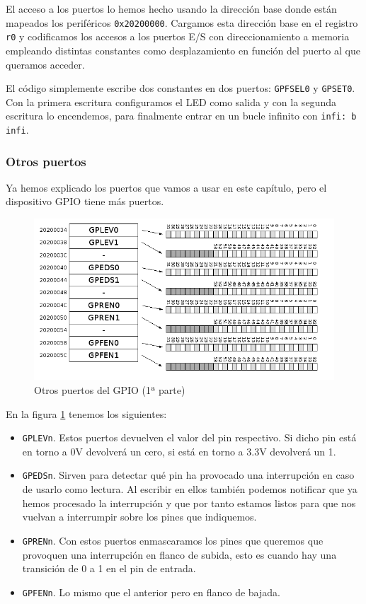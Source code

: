 El acceso a los puertos lo hemos hecho usando la dirección base donde
están mapeados los periféricos {\tt 0x20200000}. Cargamos esta dirección
base en el registro {\tt r0} y codificamos los accesos a los puertos
E/S con direccionamiento a memoria empleando distintas constantes como
desplazamiento en función del puerto al que queramos acceder.

El código simplemente escribe dos constantes en dos puertos: {\tt GPFSEL0} y {\tt GPSET0}.
Con la primera escritura configuramos el LED como salida y con la segunda escritura lo
encendemos, para finalmente entrar en un bucle infinito con {\tt infi: b infi}.

\subsubsection{Otros puertos}

Ya hemos explicado los puertos que vamos a usar en este capítulo, pero el dispositivo GPIO tiene
más puertos.

\begin{figure}[h]
  \centering
    \includegraphics[width=14cm]{graphs/gpio2.png}
  \caption{Otros puertos del GPIO (1ª parte)}
  \label{fig:gpio2}
\end{figure}

En la figura \ref{fig:gpio2} tenemos los siguientes:

\begin{itemize}
  \item {\tt GPLEVn}. Estos puertos devuelven el valor del pin respectivo. Si dicho pin está
        en torno a 0V devolverá un cero, si está en torno a 3.3V devolverá un 1.
  \item {\tt GPEDSn}. Sirven para detectar qué pin ha provocado una interrupción en caso de
        usarlo como lectura. Al escribir en ellos también podemos notificar que ya hemos procesado
        la interrupción y que por tanto estamos listos para que nos vuelvan a interrumpir sobre
        los pines que indiquemos.
  \item {\tt GPRENn}. Con estos puertos enmascaramos los pines que queremos que provoquen una
        interrupción en flanco de subida, esto es cuando hay una transición de 0 a 1 en el pin
        de entrada.
  \item {\tt GPFENn}. Lo mismo que el anterior pero en flanco de bajada.
\end{itemize}

